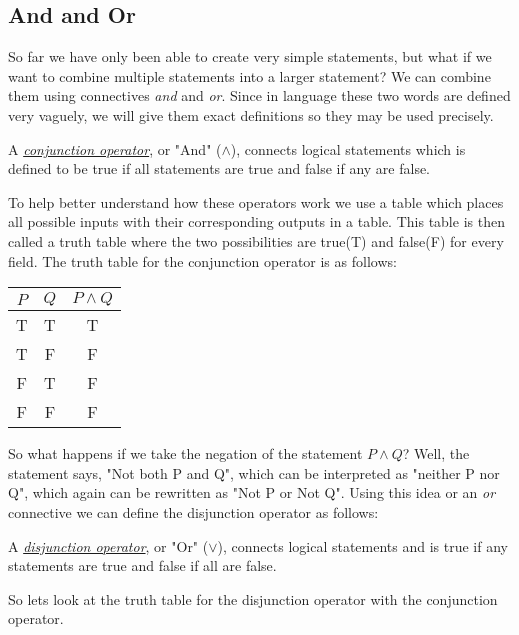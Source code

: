 \subsection{And and Or}
So far we have only been able to create very simple statements, but what if we want to combine multiple statements into a larger statement?
We can combine them using connectives \emph{and} and \emph{or}.
Since in language these two words are defined very vaguely, we will give them exact definitions so they may be used precisely.

\begin{defn}
	A \underline{\emph{conjunction operator}}, or "And" ($\land$), connects logical statements which is defined to be true if all statements are true and false if any are false.
\end{defn}

To help better understand how these operators work we use a table which places all possible inputs with their corresponding outputs in a table.
This table is then called a truth table where the two possibilities are true(T) and false(F) for every field.
The truth table for the conjunction operator is as follows:

\begin{center}
	\begin{tabular}{cc|c}
		$P$ & $Q$ & $P \land Q$ \\
		\hline
		T & T & T \\
		T & F & F \\
		F & T & F \\
		F & F & F \\
	\end{tabular}
\end{center}

So what happens if we take the negation of the statement $P \land Q$?
Well, the statement says, "Not both P and Q", which can be interpreted as "neither P nor Q", which again can be rewritten as "Not P or Not Q".
Using this idea or an \emph{or} connective we can define the disjunction operator as follows:

\begin{defn}
	A \underline{\emph{disjunction operator}}, or "Or" ($\lor$), connects logical statements and is true if any statements are true and false if all are false.
\end{defn}

So lets look at the truth table for the disjunction operator with the conjunction operator.

